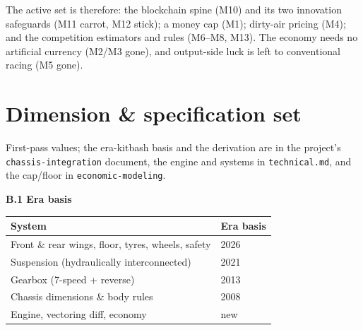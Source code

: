 \documentclass[11pt]{article}
\begin{document}
\noindent The active set is therefore: the blockchain spine (M10) and its two innovation safeguards (M11 carrot, M12 stick); a money cap (M1); dirty-air pricing (M4); and the competition estimators and rules (M6--M8, M13). The economy needs no artificial currency (M2/M3 gone), and output-side luck is left to conventional racing (M5 gone).

\section{Dimension \& specification set}
First-pass values; the era-kitbash basis and the derivation are in the project's \texttt{chassis-integration} document, the engine and systems in \texttt{technical.md}, and the cap/floor in \texttt{economic-modeling}.

{\small
\begin{center}
\textbf{B.1 Era basis} \quad
\begin{tabular}{@{}p{} p{}@{}}
\toprule
\textbf{System} & \textbf{Era basis}\\
\midrule
Front \& rear wings, floor, tyres, wheels, safety & 2026\\
Suspension (hydraulically interconnected) & 2021\\
Gearbox (7-speed + reverse) & 2013\\
Chassis dimensions \& body rules & 2008\\
Engine, vectoring diff, economy & new\\
\bottomrule
\end{tabular}
\end{center}

}
\end{document}
